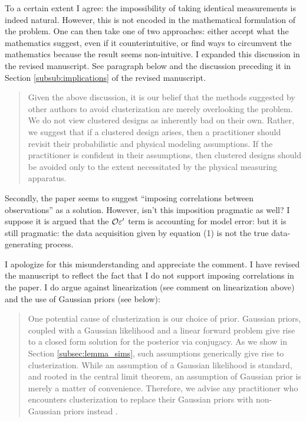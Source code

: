 \AR To a certain extent I agree: the impossibility of taking identical
measurements is indeed natural. However, this is not encoded in the
mathematical formulation of the problem. One can then take one of two
approaches: either accept what the mathematics suggest, even if it
counterintuitive, or find ways to circumvent the mathematics because
the result seems non-intuitive. I expanded this discussion in the
revised manuscript. See paragraph below and the discussion preceding
it in Section \ref{subsub:implications} of the revised manuscript.

\begin{quote}%
  Given the above discussion, it is our belief that the methods
  suggested by other authors to avoid clusterization are merely
  overlooking the problem. We do not view clustered designs as
  inherently bad on their own. Rather, we suggest that if a clustered
  design arises, then a practitioner should revisit their probabilistic
  and physical modeling assumptions. If the practitioner is confident in
  their assumptions, then clustered designs should be avoided only to
  the extent necessitated by the physical measuring apparatus.
\end{quote}


\RC Secondly, the paper seems to suggest “imposing correlations
between observations” as a solution. However, isn’t this imposition
pragmatic as well? I suppose it is argued that the $\mathcal{O} \varepsilon'$ term
is accounting for model error: but it is still pragmatic: the data
acquisition given by equation (1) is not the true data-generating
process.

\AR I apologize for this misunderstanding and appreciate the
comment. I have revised the manuscript to reflect the fact that I do
not support imposing correlations in the paper. I do argue against
linearization (see comment on linearization above) and the use of Gaussian priors (see below):

\begin{quote} %
One potential cause of clusterization is our choice of prior. Gaussian
priors, coupled with a Gaussian likelihood and a linear forward
problem give rise to a closed form solution for the posterior via
conjugacy. As we show in Section \ref{subsec:lemma_sims}, such
assumptions generically give rise to clusterization. While an
assumption of a Gaussian likelihood is standard, and rooted in the
central limit theorem, an assumption of Gaussian prior is merely a
matter of convenience. Therefore, we advise any practitioner who
encounters clusterization to replace their Gaussian priors with
non-Gaussian priors instead \cite{hosseini2017, hosseini2019}.
\end{quote}


